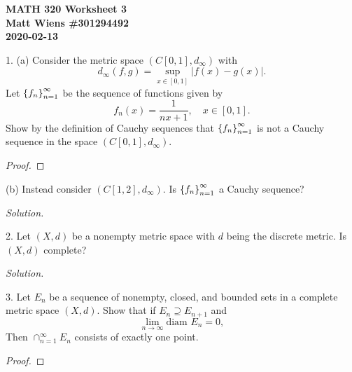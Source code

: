 \documentclass{article}
\begin{document}
\textbf{MATH 320 Worksheet 3} \\
\textbf{Matt Wiens \#301294492} \\
\textbf{2020-02-13}

1. (a) Consider the metric space $(C[0, 1], d_\infty)$ with
%
\begin{equation*}
    d_\infty(f, g) = \sup_{x \in [0, 1]} |f(x) - g(x)|
    .
\end{equation*}
%
Let $\cbr{f_n}_{n = 1}^\infty$ be the sequence of functions given by
%
\begin{equation*}
    f_n(x) = \frac{1}{n x + 1}, \quad x \in [0, 1].
\end{equation*}
%
Show by the definition of Cauchy sequences that $\cbr{f_n}_{n =
1}^\infty$ is not a Cauchy sequence in the space $(C[0, 1], d_\infty)$.

\begin{proof}

\end{proof}

\newpage

(b) Instead consider $(C[1, 2], d_\infty)$. Is $\cbr{f_n}_{n =
1}^\infty$ a Cauchy sequence?

\textit{Solution.}

\newpage

2. Let $(X, d)$ be a nonempty metric space with $d$ being the discrete
metric. Is $(X, d)$ complete?

\textit{Solution.}

\newpage

3. Let $E_n$ be a sequence of nonempty, closed, and bounded sets in a
complete metric space $(X, d)$. Show that if $E_n \supseteq E_{n+1}$ and
%
\begin{equation*}
    \lim_{n \to \infty} \text{diam } E_n = 0,
\end{equation*}
%
Then $\cap_{n = 1}^{\infty} E_n$ consists of exactly one point.

\begin{proof}

\end{proof}
\end{document}
